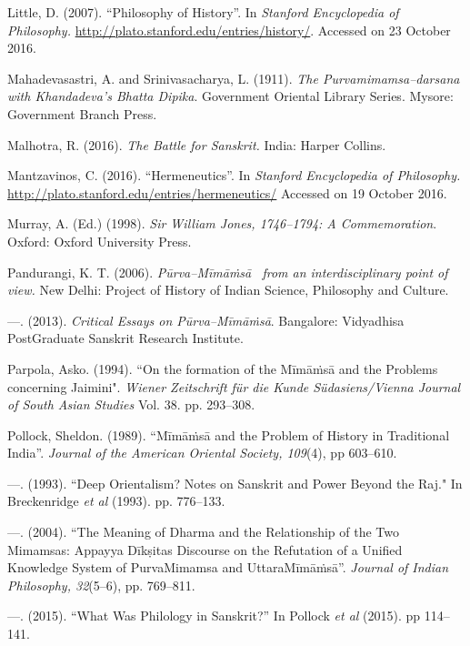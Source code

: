 \begin{thebibliography}{99}
  Little, D. (2007). “Philosophy of History”. In \textit{Stanford Encyclopedia of Philosophy.} \url{http://plato.stanford.edu/entries/history/}. Accessed on 23 October 2016.

  Mahadevasastri, A. and Srinivasacharya, L. (1911). \textit{The Purvamimamsa–darsana with Khandadeva's Bhatta Dipika}. Government Oriental Library Series. Mysore: Government Branch Press.

  Malhotra, R. (2016). \textit{The Battle for Sanskrit.} India: Harper Collins.

  Mantzavinos, C. (2016). “Hermeneutics”. In \textit{Stanford Encyclopedia of Philosophy.} \url{http://plato.stanford.edu/entries/hermeneutics/} Accessed on 19 October 2016.

  Murray, A. (Ed.) (1998). \textit{Sir William Jones, 1746–1794: A Commemoration}. Oxford: Oxford University Press.

  Pandurangi, K. T. (2006). \textit{Pūrva–Mīmāṁsā  from an interdisciplinary point of view.} New Delhi: Project of History of Indian Science, Philosophy and Culture.

  —. (2013). \textit{Critical Essays on Pūrva–Mīmāṁsā}. Bangalore: Vidyadhisa PostGraduate Sanskrit Research Institute.

  Parpola, Asko. (1994). ``On the formation of the Mīmāṁsā and the Problems concerning Jaimini". \textit{Wiener Zeitschrift für die Kunde Südasiens/Vienna Journal of South Asian Studies} Vol. 38. pp. 293–308.

  Pollock, Sheldon. (1989). “Mīmāṁsā and the Problem of History in Traditional India”. \textit{Journal of the American Oriental Society, 109}(4), pp 603–610.

  —. (1993). ``Deep Orientalism? Notes on Sanskrit and Power Beyond the Raj." In Breckenridge \textit{et al} (1993). pp. 776–133.

  —. (2004). “The Meaning of Dharma and the Relationship of the Two Mimamsas: Appayya Dīkṣitas Discourse on the Refutation of a Unified Knowledge System of PurvaMimamsa and UttaraMīmāṁsā”. \textit{Journal of Indian Philosophy, 32}(5–6), pp. 769–811.

  —. (2015). “What Was Philology in Sanskrit?” In Pollock \textit{et al} (2015). pp 114–141.


\end{thebibliography}
